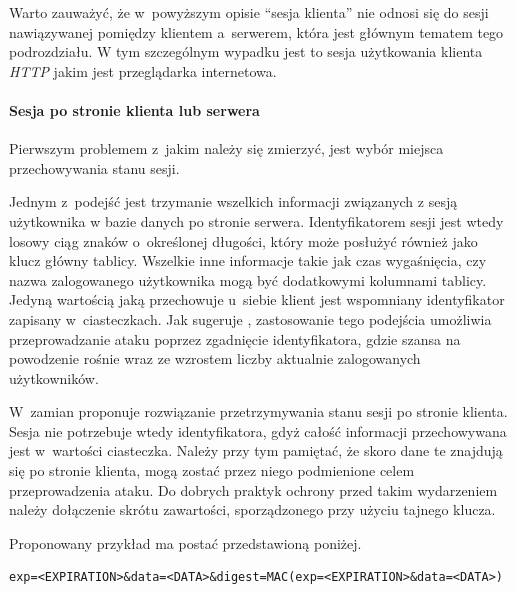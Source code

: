 \documentclass[11pt]{aghdpl}
\begin{document}
Warto zauważyć, że w~powyższym opisie ``sesja klienta'' nie odnosi się do sesji nawiązywanej pomiędzy klientem a~serwerem, która jest głównym tematem tego podrozdziału. W tym szczególnym wypadku jest to sesja użytkowania klienta \emph{HTTP} jakim jest przeglądarka internetowa.

\paragraph{Sesja po stronie klienta lub serwera}

Pierwszym problemem z~jakim należy się zmierzyć, jest wybór miejsca przechowywania stanu sesji. 

Jednym z~podejść jest trzymanie wszelkich informacji związanych z sesją użytkownika w bazie danych po stronie serwera. Identyfikatorem sesji jest wtedy losowy ciąg znaków o~określonej długości, który może posłużyć również jako klucz główny tablicy. Wszelkie inne informacje takie jak czas wygaśnięcia, czy nazwa zalogowanego użytkownika mogą być dodatkowymi kolumnami tablicy. Jedyną wartością jaką przechowuje u~siebie klient jest wspomniany identyfikator zapisany w~ciasteczkach. Jak sugeruje \cite{ClAu}, zastosowanie tego podejścia umożliwia przeprowadzanie ataku poprzez zgadnięcie identyfikatora, gdzie szansa na powodzenie rośnie wraz ze wzrostem liczby aktualnie zalogowanych użytkowników.

W~zamian \cite{ClAu} proponuje rozwiązanie przetrzymywania stanu sesji po stronie klienta. Sesja nie potrzebuje wtedy identyfikatora, gdyż całość informacji przechowywana jest w~wartości ciasteczka. Należy przy tym pamiętać, że skoro dane te znajdują się po stronie klienta, mogą zostać przez niego podmienione celem przeprowadzenia ataku. Do dobrych praktyk ochrony przed takim wydarzeniem należy dołączenie skrótu zawartości, sporządzonego przy użyciu tajnego klucza.

Proponowany przykład ma postać przedstawioną poniżej.
\begin{lstlisting}
exp=<EXPIRATION>&data=<DATA>&digest=MAC(exp=<EXPIRATION>&data=<DATA>)
\end{lstlisting}
\end{document}

